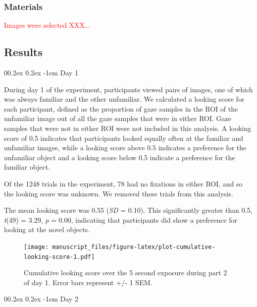 \documentclass[
  man,floatsintext]{apa6}
\makeatletter
\let\oldparagraph\paragraph
\renewcommand{\paragraph}[1]{\oldparagraph{#1}\mbox{}}
\renewcommand{\paragraph}{\@startsection{paragraph}{4}{\parindent}%
  {0\baselineskip \@plus 0.2ex \@minus 0.2ex}%
  {-1em}%
  {\normalfont\normalsize\bfseries\itshape\typesectitle}}
\makeatother
\begin{document}
\hypertarget{materials}{%
\subsubsection{Materials}\label{materials}}

\textcolor{red}{Images were selected XXX...}

\hypertarget{results-2}{%
\subsection{Results}\label{results-2}}

\hypertarget{day-1}{%
\paragraph{Day 1}\label{day-1}}

During day 1 of the experiment, participants viewed pairs of images, one of which was always familiar and the other unfamiliar. We calculated a looking score for each participant, defined as the proportion of gaze samples in the ROI of the unfamiliar image out of all the gaze samples that were in either ROI. Gaze samples that were not in either ROI were not included in this analysis. A looking score of 0.5 indicates that participants looked equally often at the familiar and unfamiliar images, while a looking score above 0.5 indicates a preference for the unfamiliar object and a looking score below 0.5 indicate a preference for the familiar object.

Of the 1248 trials in the experiment, 78 had no fixations in either ROI, and so the looking score was unknown. We removed these trials from this analysis.

The mean looking score was 0.55 (\emph{SD} = 0.10). This significantly greater than 0.5, \emph{t}(49) = 3.29, \emph{p} = 0.00, indicating that participants did show a preference for looking at the novel objects.

\begin{figure}
\centering
\texttt{[image: manuscript\_files/figure-latex/plot-cumulative-looking-score-1.pdf]}
\caption{\label{fig:plot-cumulative-looking-score}Cumulative looking score over the 5 second exposure during part 2 of day 1. Error bars represent +/- 1 SEM.}
\end{figure}

\hypertarget{day-2}{%
\paragraph{Day 2}\label{day-2}}
\end{document}
